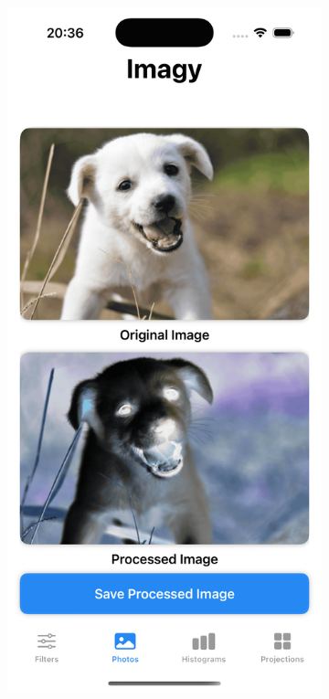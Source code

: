 \documentclass[a4paper]{article}
\begin{document}
\begin{figure}[H]
    \centering
    \begin{subfigure}{0.2\textwidth}
        \centering
        \includegraphics[width=\linewidth]{images/dog_negative.png}

\end{subfigure}
\end{figure}
\end{document}

